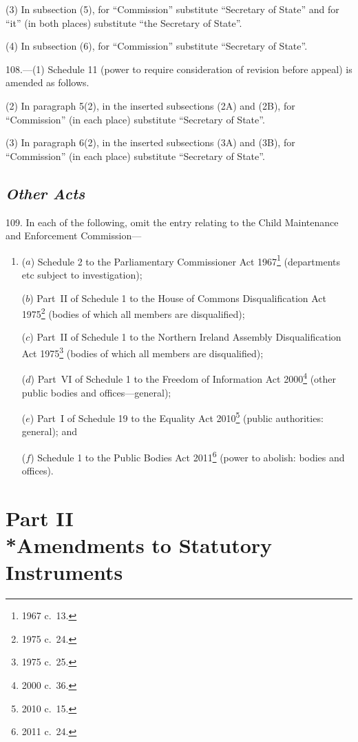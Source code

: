 \documentclass[12pt,a4paper]{article}
\begin{document}
(3) In subsection (5), for “Commission” substitute “Secretary of State” and for “it” (in both places) substitute “the Secretary of State”.

(4) In subsection (6), for “Commission” substitute “Secretary of State”.

\medskip

108.---(1)  Schedule 11 (power to require consideration of revision before appeal) is amended as follows.

(2) In paragraph 5(2), in the inserted subsections (2A) and (2B), for “Commission” (in each place) substitute “Secretary of State”.

(3) In paragraph 6(2), in the inserted subsections (3A) and (3B), for “Commission” (in each place) substitute “Secretary of State”.

\subsection*{\itshape Other Acts}

109.  In each of the following, omit the entry relating to the Child Maintenance and Enforcement Commission—
\begin{enumerate}\item[]
($a$) Schedule 2 to the Parliamentary Commissioner Act 1967\footnote{1967 c.~13.} (departments etc subject to investigation);

\enlargethispage{-2\baselineskip}

($b$) Part~II of Schedule 1 to the House of Commons Disqualification Act 1975\footnote{1975 c.~24.} (bodies of which all members are disqualified);

($c$) Part~II of Schedule 1 to the Northern Ireland Assembly Disqualification Act 1975\footnote{1975 c.~25.} (bodies of which all members are disqualified);

($d$) Part~VI of Schedule 1 to the Freedom of Information Act 2000\footnote{2000 c.~36.} (other public bodies and offices---general);

($e$) Part~I of Schedule 19 to the Equality Act 2010\footnote{2010 c.~15.} (public authorities: general); and

($f$) Schedule 1 to the Public Bodies Act 2011\footnote{2011 c.~24.} (power to abolish: bodies and offices).
\end{enumerate}

\section[Part II --- Amendments to Statutory Instruments]{Part II\\*Amendments to Statutory Instruments}
\end{document}
